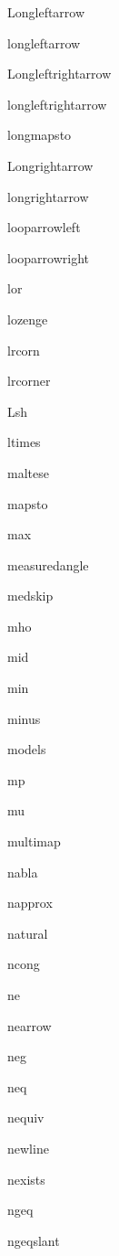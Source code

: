\documentclass{article}
\begin{document}
Longleftarrow    \Longleftarrow{}

longleftarrow    \longleftarrow{}

Longleftrightarrow    \Longleftrightarrow{}

longleftrightarrow    \longleftrightarrow{}

longmapsto    \longmapsto{}

Longrightarrow    \Longrightarrow{}

longrightarrow    \longrightarrow{}

looparrowleft    \looparrowleft{}

looparrowright    \looparrowright{}

lor    \lor{}

lozenge    \lozenge{}

lrcorn    \lrcorn{}

lrcorner    \lrcorner{}

Lsh    \Lsh{}

ltimes    \ltimes{}


maltese    \maltese{}

mapsto    \mapsto{}

max    \max{}

measuredangle    \measuredangle{}

medskip    \medskip{}

mho    \mho{}

mid    \mid{}

min    \min{}

minus    \minus{}

models    \models{}

mp    \mp{}

mu    \mu{}

multimap    \multimap{}


nabla    \nabla{}

napprox    \napprox{}

natural    \natural{}

ncong    \ncong{}

ne    \ne{}

nearrow    \nearrow{}

neg    \neg{}

neq    \neq{}

nequiv    \nequiv{}

newline    \newline{}

nexists    \nexists{}

ngeq    \ngeq{}

ngeqslant    \ngeqslant{}
\end{document}
